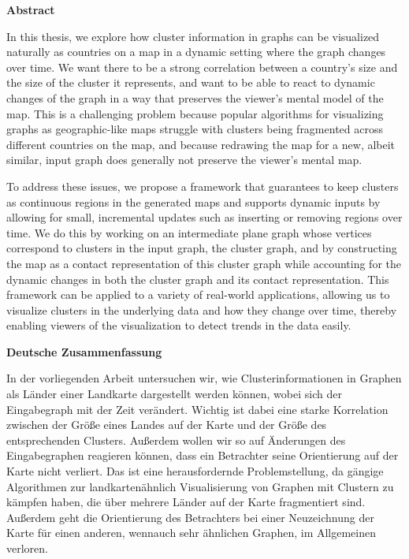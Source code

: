 \begin{addmargin}{0.5cm}

\centerline{\textbf{Abstract}}

In this thesis, we explore how cluster information in graphs can be visualized naturally as countries on a map in a dynamic setting where the graph changes over time.
We want there to be a strong correlation between a country's size and the size of the cluster it represents, and want to be able to react to dynamic changes of the graph in a way that preserves the viewer's mental model of the map.
This is a challenging problem because popular algorithms for visualizing graphs as geographic-like maps struggle with clusters being fragmented across different countries on the map, and because redrawing the map for a new, albeit similar, input graph does generally not preserve the viewer's mental map.

To address these issues, we propose a framework that guarantees to keep clusters as continuous regions in the generated maps and supports dynamic inputs by allowing for small, incremental updates such as inserting or removing regions over time.
We do this by working on an intermediate plane graph whose vertices correspond to clusters in the input graph, the cluster graph, and by constructing the map as a contact representation of this cluster graph while accounting for the dynamic changes in both the cluster graph and its contact representation.
This framework can be applied to a variety of real-world applications, allowing us to visualize clusters in the underlying data and how they change over time, thereby enabling viewers of the visualization to detect trends in the data easily.

\vskip 2cm

\centerline{\textbf{Deutsche Zusammenfassung}}

In der vorliegenden Arbeit untersuchen wir, wie Clusterinformationen in Graphen als Länder einer Landkarte dargestellt werden können, wobei sich der Eingabegraph mit der Zeit verändert.
Wichtig ist dabei eine starke Korrelation zwischen der Größe eines Landes auf der Karte und der Größe des entsprechenden Clusters.
Außerdem wollen wir so auf Änderungen des Eingabegraphen reagieren können, dass ein Betrachter seine Orientierung auf der Karte nicht verliert.
Das ist eine herausfordernde Problemstellung, da gängige Algorithmen zur landkartenähnlich Visualisierung von Graphen mit Clustern zu kämpfen haben, die über mehrere Länder auf der Karte fragmentiert sind.
Außerdem geht die Orientierung des Betrachters bei einer Neuzeichnung der Karte für einen anderen, wennauch sehr ähnlichen Graphen, im Allgemeinen verloren.


\end{addmargin}
